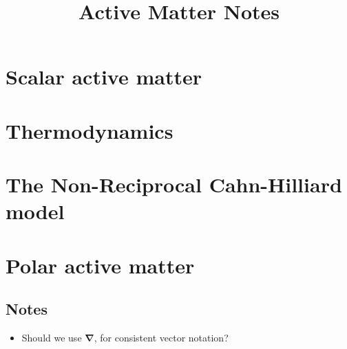 \documentclass[10pt, a4paper, oneside]{book}
\title{Active Matter Notes}
\begin{document}
    \maketitle
    \clearpage


    \tableofcontents
    \clearpage

    \setlength{\parindent}{0em}
    \setlength{\parskip}{0.8em}


    

    \chapter{Scalar active matter}
    

    \chapter{Thermodynamics}
     

    \chapter{The Non-Reciprocal Cahn-Hilliard model}
    

    \chapter{Polar active matter}
    


    
    

    
    \setcounter{tocdepth}{1}
    \listoftodos
    
    \section*{Notes}
    \begin{itemize}
        \item Should we use $\bm \nabla$, for consistent vector notation?
    \end{itemize}
\end{document}
